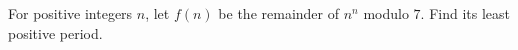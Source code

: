 For positive integers $n$, let $f(n)$ be the remainder of $n^n$ modulo $7$. Find its least positive period.
